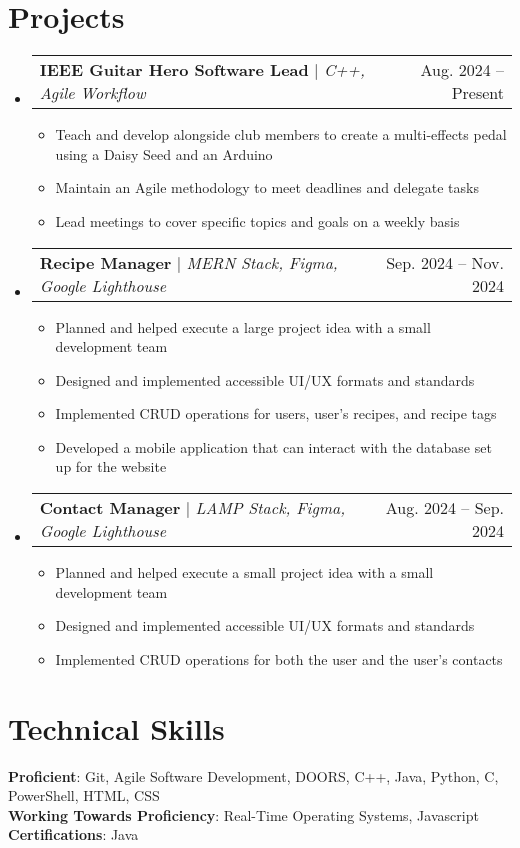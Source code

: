\documentclass[letterpaper,11pt]{article}
\makeatletter
\newcommand{\resumeItem}[1]{
  \item\small{
    {#1 \vspace{-2pt}}
  }
}
\newcommand{\resumeProjectHeading}[2]{
    \item
    \begin{tabular*}{0.97\textwidth}{l@{\extracolsep{\fill}}r}
      \small#1 & #2 \\
    \end{tabular*}\vspace{-7pt}
}
\newcommand{\resumeSubHeadingListStart}{\begin{itemize}[leftmargin=0.15in, label={}]}
\newcommand{\resumeSubHeadingListEnd}{\end{itemize}}
\newcommand{\resumeItemListStart}{\begin{itemize}}
\newcommand{\resumeItemListEnd}{\end{itemize}\vspace{-5pt}}
\makeatother
\begin{document}
\section{Projects}
    \resumeSubHeadingListStart
      \resumeProjectHeading
          {\textbf{IEEE Guitar Hero Software Lead} $|$ \emph{C++, Agile Workflow}}{Aug. 2024 -- Present}
          \resumeItemListStart
            \resumeItem{Teach and develop alongside club members to create a multi-effects pedal using a Daisy Seed and an Arduino}
            \resumeItem{Maintain an Agile methodology to meet deadlines and delegate tasks}
            \resumeItem{Lead meetings to cover specific topics and goals on a weekly basis}
          \resumeItemListEnd
      \resumeProjectHeading
          {\textbf{Recipe Manager} $|$ \emph{MERN Stack, Figma, Google Lighthouse}}{Sep. 2024 -- Nov. 2024}
          \resumeItemListStart
            \resumeItem{Planned and helped execute a large project idea with a small development team}
            \resumeItem{Designed and implemented accessible UI/UX formats and standards}
            \resumeItem{Implemented CRUD operations for users, user's recipes, and recipe tags}
            \resumeItem{Developed a mobile application that can interact with the database set up for the website}
          \resumeItemListEnd
      \resumeProjectHeading
          {\textbf{Contact Manager} $|$ \emph{LAMP Stack, Figma, Google Lighthouse}}{Aug. 2024 -- Sep. 2024}
          \resumeItemListStart
            \resumeItem{Planned and helped execute a small project idea with a small development team}
            \resumeItem{Designed and implemented accessible UI/UX formats and standards}
            \resumeItem{Implemented CRUD operations for both the user and the user's contacts}
          \resumeItemListEnd
    \resumeSubHeadingListEnd

\section{Technical Skills}
 \begin{itemize}[leftmargin=0.15in, label={}]
    \small{\item{
     \textbf{Proficient}{: Git, Agile Software Development, DOORS, C++, Java, Python, C, PowerShell, HTML, CSS} \\
     \textbf{Working Towards Proficiency}{: Real-Time Operating Systems, Javascript} \\
     \textbf{Certifications}{: Java}
    }}
 \end{itemize}

\end{document}
